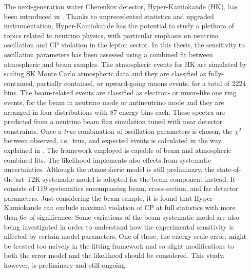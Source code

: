 The next-generation water Cherenkov detector, Hyper-Kamiokande (HK), has been introduced in .
Thanks to unprecedented statistics and upgraded instrumentation, Hyper-Kamiokande has the potential %
to study a plethora of topics related to neutrino physics, %
with particular emphasis on neutrino oscillation and CP violation in the lepton sector.
In this thesis, the sensitivity to oscillation parameters has been assessed %
using a combined fit between atmospheric and beam samples.
The atmospheric events for HK are simulated by scaling SK Monte Carlo atmospheric data %
and they are classified as fully-contained, partially contained, or upward-going muons events, for a total of 2224 bins.
The beam-related events are classified as electron- or muon-like one ring events, %
for the beam in neutrino mode or antineutrino mode and they are arranged in four distributions with 87 energy bins each.
These spectra are predicted from a neutrino beam flux simulation tuned with near detector constraints.
Once a \emph{true} combination of oscillation parameters is chosen, the $\chi^2$ between observed, i.e.\ true, %
and expected events is calculated in the way explained in .
The framework employed is capable of beam and atmospheric combined fits.
The likelihood implements also effects from systematic uncertainties.
Although the atmospheric model is still preliminary, the state-of-the-art T2K systematic model %
is adopted for the beam component instead.
It consists of 119 systematics encompassing beam, cross-section, and far detector parameters.
Just considering the beam sample, it is found that Hyper-Kamiokande can exclude maximal %
violation of CP at full statistics with more than $6\sigma$ of significance.
Some variations of the beam systematic model are also being investigated in order to understand %
how the experimental sensitivity is affected by certain model parameters. 
One of these, the energy scale error, might be treated too naively in the fitting framework %
and so slight modifications to both the error model and the likelihood should be considered.
This study, however, is preliminary and still ongoing.



